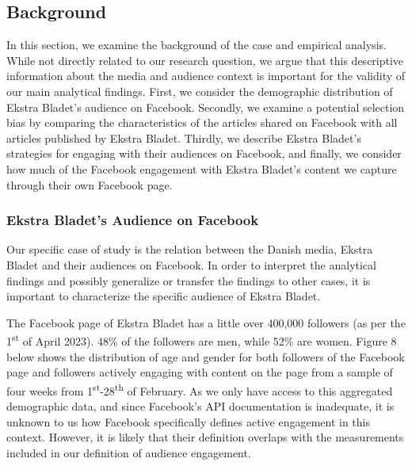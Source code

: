 \documentclass[
]{article}
\begin{document}
\hypertarget{background-1}{%
\subsection{Background}\label{background-1}}

In this section, we examine the background of the case and empirical
analysis. While not directly related to our research question, we argue
that this descriptive information about the media and audience context
is important for the validity of our main analytical findings. First, we
consider the demographic distribution of Ekstra Bladet's audience on
Facebook. Secondly, we examine a potential selection bias by comparing
the characteristics of the articles shared on Facebook with all articles
published by Ekstra Bladet. Thirdly, we describe Ekstra Bladet's
strategies for engaging with their audiences on Facebook, and finally,
we consider how much of the Facebook engagement with Ekstra Bladet's
content we capture through their own Facebook page.

\hypertarget{ekstra-bladets-audience-on-facebook}{%
\subsubsection{Ekstra Bladet's Audience on
Facebook}\label{ekstra-bladets-audience-on-facebook}}

\noindent Our specific case of study is the relation between the Danish
media, Ekstra Bladet and their audiences on Facebook. In order to
interpret the analytical findings and possibly generalize or transfer
the findings to other cases, it is important to characterize the
specific audience of Ekstra Bladet.

The Facebook page of Ekstra Bladet has a little over 400,000 followers
(as per the 1\textsuperscript{st} of April 2023). 48\% of the followers
are men, while 52\% are women. Figure 8 below shows the distribution of
age and gender for both followers of the Facebook page and followers
actively engaging with content on the page from a sample of four weeks
from 1\textsuperscript{st}-28\textsuperscript{th} of February. As we
only have access to this aggregated demographic data, and since
Facebook's API documentation is inadequate, it is unknown to us how
Facebook specifically defines active engagement in this context.
However, it is likely that their definition overlaps with the
measurements included in our definition of audience engagement.
\end{document}

